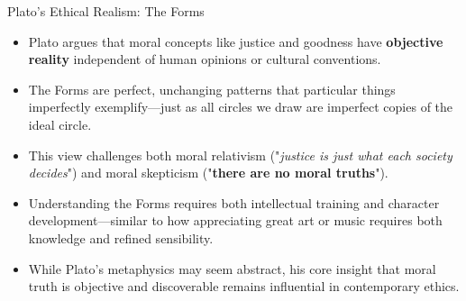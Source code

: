 \documentclass[aspectratio=169]{beamer}
\begin{document}
\begin{frame}{Plato's Ethical Realism: The Forms}
\begin{itemize}
\item Plato argues that moral concepts like justice and goodness have \textbf{objective reality} independent of human opinions or cultural conventions.
\item The Forms are perfect, unchanging patterns that particular things imperfectly exemplify—just as all circles we draw are imperfect copies of the ideal circle.
\item This view challenges both moral relativism ("\emph{justice is just what each society decides}") and moral skepticism ("\textbf{there are no moral truths}").
\item Understanding the Forms requires both intellectual training and character development—similar to how appreciating great art or music requires both knowledge and refined sensibility.
\item While Plato's metaphysics may seem abstract, his core insight that moral truth is objective and discoverable remains influential in contemporary ethics.
\end{itemize}
\end{frame}
\end{document}

